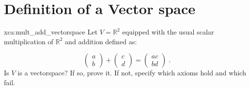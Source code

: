 \section{Definition of a Vector space}

\begin{xca}{xca:mult_add_vectorspace}
Let $V = \mathbb{R}^2$ equipped with the usual scalar multiplication of $\mathbb{R}^2$ and addition defined as:

$$\begin{pmatrix}
a \\
b
\end{pmatrix} + \begin{pmatrix}
c \\
d
\end{pmatrix} = \begin{pmatrix}
ac \\
bd
\end{pmatrix}\;.$$
Is $V$ is a vectorspace? If so, prove it. If not, specify which axioms hold and which fail.
\end{xca}

